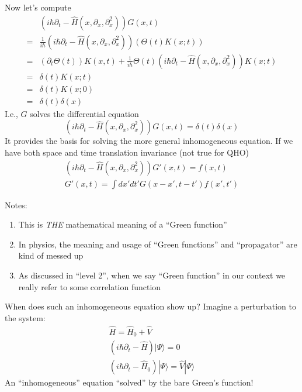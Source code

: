 Now let's compute
\begin{align*}
    &\left( i\hbar \partial _t-\hat{H}\left( x,\partial _x,\partial _{x}^{2} \right) \right) G\left( x,t \right) \\
    =&\frac{1}{i\hbar}\left( i\hbar \partial _t-\hat{H}\left( x,\partial _x,\partial _{x}^{2} \right) \right) \left( \Theta \left( t \right) K\left( x;t \right) \right) \\
    =&\left( \partial _t\Theta \left( t \right) \right) K\left( x,t \right) +\frac{1}{i\hbar}\Theta \left( t \right) \left( i\hbar \partial _t-\hat{H}\left( x,\partial _x,\partial _{x}^{2} \right) \right) K\left( x;t \right) \\
    =&\delta \left( t \right) K\left( x;t \right) \\
    =&\delta \left( t \right) K\left( x;0 \right) \\
    =&\delta \left( t \right) \delta \left( x \right)
\end{align*}
I.e., $G$ solves the differential equation
\[ \left( i\hbar \partial _t-\hat{H}\left( x,\partial _x,\partial _{x}^{2} \right) \right) G\left( x,t \right) =\delta \left( t \right) \delta \left( x \right) \]
It provides the basis for solving the more general inhomogeneous equation. If we have both space and time translation invariance (not true for QHO)
\begin{gather*}
    \left( i\hbar \partial _t-\hat{H}\left( x,\partial _x,\partial _{x}^{2} \right) \right) G'\left( x,t \right) =f\left( x,t \right) \\
    G'\left( x,t \right) =\int{dx'dt'G\left( x-x',t-t' \right) f\left( x',t' \right)}
\end{gather*}

Notes:
\begin{enumerate}
    \item This is \emph{THE} mathematical meaning of a ``Green function''
    \item In physics, the meaning and usage of ``Green functions'' and ``propagator'' are kind of messed up
    \item As discussed in ``level 2'', when we say ``Green function'' in our context we really refer to some correlation function
\end{enumerate}
When does such an inhomogeneous equation show up? Imagine a perturbation to the system:
\begin{gather*}
    \hat{H}=\hat{H}_0+\hat{V}\\
    \left( i\hbar \partial _t-\hat{H} \right) |\Psi \rangle =0\\
    \left( i\hbar \partial _t-\hat{H}_0 \right) |\Psi \rangle =\hat{V}|\Psi \rangle
\end{gather*}
An ``inhomogeneous'' equation ``solved'' by the bare Green's function!

